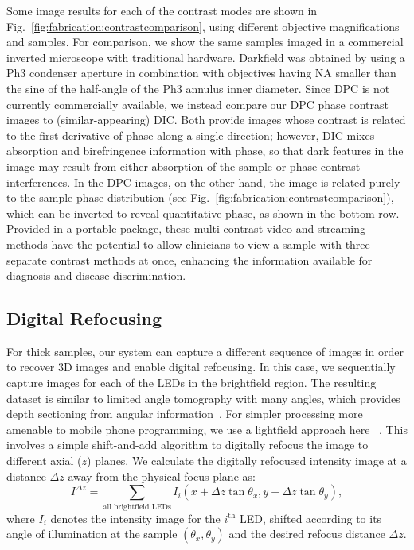 Some image results for each of the contrast modes are shown in Fig.~\ref{fig:fabrication:contrastcomparison}, using different objective magnifications and samples. For comparison, we show the same samples imaged in a commercial inverted microscope with traditional hardware. Darkfield was obtained by using a Ph3 condenser aperture in combination with objectives having NA smaller than the sine of the half-angle of the Ph3 annulus inner diameter. Since DPC is not currently commercially available, we instead compare our DPC phase contrast images to (similar-appearing) DIC. Both provide images whose contrast is related to the first derivative of phase along a single direction; however, DIC mixes absorption and birefringence information with phase, so that dark features in the image may result from either absorption of the sample or phase contrast interferences. In the DPC images, on the other hand, the image is related purely to the sample phase distribution (see Fig.~\ref{fig:fabrication:contrastcomparison}), which can be inverted to reveal quantitative phase, as shown in the bottom row. Provided in a portable package, these multi-contrast video and streaming methods have the potential to allow clinicians to view a sample with three separate contrast methods at once, enhancing the information available for diagnosis and disease discrimination.

\subsection{Digital Refocusing}
For thick samples, our system can capture a different sequence of images in order to recover 3D images and enable digital refocusing. In this case, we sequentially capture images for each of the LEDs in the brightfield region. The resulting dataset is similar to limited angle tomography with many angles, which provides depth sectioning from angular information~\cite{Kak:1988fk}. For simpler processing more amenable to mobile phone programming, we use a lightfield approach here ~\cite{Ng2005,Zheng2011}. This involves a simple shift-and-add algorithm to digitally refocus the image to different axial ($z$) planes. We calculate the digitally refocused intensity image at a distance $\Delta z$ away from the physical focus plane as:
\begin{equation}
I^{\Delta z} = \sum_{\text{all brightfield LEDs}}I_i(x+\Delta z\tan{\theta_x}, y+\Delta z\tan{\theta_y}),
\label{I_refocus}
\end{equation}
where $I_i$ denotes the intensity image for the $i^{\text{th}}$ LED, shifted according to its angle of illumination at the sample $(\theta_x,\theta_y)$ and the desired refocus distance $\Delta z$.

